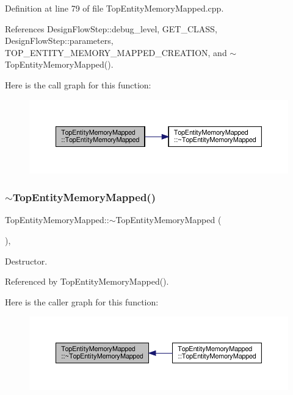 Definition at line 79 of file Top\+Entity\+Memory\+Mapped.\+cpp.



References Design\+Flow\+Step\+::debug\+\_\+level, G\+E\+T\+\_\+\+C\+L\+A\+SS, Design\+Flow\+Step\+::parameters, T\+O\+P\+\_\+\+E\+N\+T\+I\+T\+Y\+\_\+\+M\+E\+M\+O\+R\+Y\+\_\+\+M\+A\+P\+P\+E\+D\+\_\+\+C\+R\+E\+A\+T\+I\+ON, and $\sim$\+Top\+Entity\+Memory\+Mapped().

Here is the call graph for this function\+:
\nopagebreak
\begin{figure}[H]
\begin{center}
\leavevmode
\includegraphics[width=350pt]{d1/db6/classTopEntityMemoryMapped_a2c4aa04c1327b581f3ea9fb63ebfc8f4_cgraph}
\end{center}
\end{figure}
\mbox{\label{classTopEntityMemoryMapped_a6fe31df8802c62dda83459b8176349be}} 
\subsubsection{\texorpdfstring{$\sim$\+Top\+Entity\+Memory\+Mapped()}{~TopEntityMemoryMapped()}}
{\footnotesize\ttfamily Top\+Entity\+Memory\+Mapped\+::$\sim$\+Top\+Entity\+Memory\+Mapped (\begin{DoxyParamCaption}{ }\end{DoxyParamCaption})\hspace{0.3cm}{\ttfamily [override]}, {\ttfamily [default]}}



Destructor. 



Referenced by Top\+Entity\+Memory\+Mapped().

Here is the caller graph for this function\+:
\nopagebreak
\begin{figure}[H]
\begin{center}
\leavevmode
\includegraphics[width=350pt]{d1/db6/classTopEntityMemoryMapped_a6fe31df8802c62dda83459b8176349be_icgraph}
\end{center}
\end{figure}


